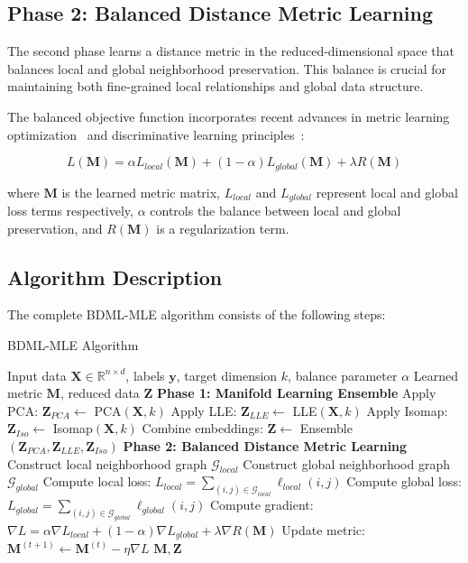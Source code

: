 \documentclass[review]{elsarticle}
\begin{document}
\subsection{Phase 2: Balanced Distance Metric Learning}

The second phase learns a distance metric in the reduced-dimensional space that balances local and global neighborhood preservation. This balance is crucial for maintaining both fine-grained local relationships and global data structure.

The balanced objective function incorporates recent advances in metric learning optimization~\cite{pan2025metric} and discriminative learning principles~\cite{duan2025discriminative}:

\begin{equation}
L(\mathbf{M}) = \alpha L_{local}(\mathbf{M}) + (1-\alpha) L_{global}(\mathbf{M}) + \lambda R(\mathbf{M})
\end{equation}

where $\mathbf{M}$ is the learned metric matrix, $L_{local}$ and $L_{global}$ represent local and global loss terms respectively, $\alpha$ controls the balance between local and global preservation, and $R(\mathbf{M})$ is a regularization term.

\subsection{Algorithm Description}

The complete BDML-MLE algorithm consists of the following steps:

\begin{algorithm}
\caption{BDML-MLE Algorithm}
\begin{algorithmic}[1]
\REQUIRE Input data $\mathbf{X} \in \mathbb{R}^{n \times d}$, labels $\mathbf{y}$, target dimension $k$, balance parameter $\alpha$
\ENSURE Learned metric $\mathbf{M}$, reduced data $\mathbf{Z}$
\STATE \textbf{Phase 1: Manifold Learning Ensemble}
\STATE Apply PCA: $\mathbf{Z}_{PCA} \leftarrow$ PCA$(\mathbf{X}, k)$
\STATE Apply LLE: $\mathbf{Z}_{LLE} \leftarrow$ LLE$(\mathbf{X}, k)$
\STATE Apply Isomap: $\mathbf{Z}_{Iso} \leftarrow$ Isomap$(\mathbf{X}, k)$
\STATE Combine embeddings: $\mathbf{Z} \leftarrow$ Ensemble$(\mathbf{Z}_{PCA}, \mathbf{Z}_{LLE}, \mathbf{Z}_{Iso})$
\STATE \textbf{Phase 2: Balanced Distance Metric Learning}
\STATE Construct local neighborhood graph $\mathcal{G}_{local}$
\STATE Construct global neighborhood graph $\mathcal{G}_{global}$
\STATE Compute local loss: $L_{local} = \sum_{(i,j) \in \mathcal{G}_{local}} \ell_{local}(i,j)$
\STATE Compute global loss: $L_{global} = \sum_{(i,j) \in \mathcal{G}_{global}} \ell_{global}(i,j)$
\STATE Compute gradient: $\nabla L = \alpha \nabla L_{local} + (1-\alpha) \nabla L_{global} + \lambda \nabla R(\mathbf{M})$
\STATE Update metric: $\mathbf{M}^{(t+1)} \leftarrow \mathbf{M}^{(t)} - \eta \nabla L$
\ENDFOR
\RETURN $\mathbf{M}, \mathbf{Z}$
\end{algorithmic}
\end{algorithm}
\end{document}
